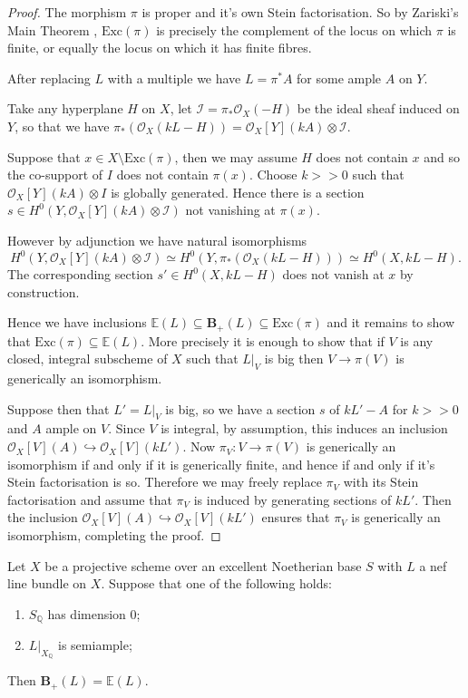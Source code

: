 \documentclass[a4paper,12pt]{book}
\newcommand{\BS}{\mathbf{B}_{+}}
\newcommand{\ox}{\mathcal{O}_{X}}
\begin{document}
\begin{proof}
	
	The morphism $\pi$ is proper and it's own Stein factorisation. So by Zariski's Main Theorem \cite[Tag 03GW]{stacks-project}, $\text{Exc}(\pi)$ is precisely the complement of the locus on which $\pi$ is finite, or equally the locus on which it has finite fibres.
	
	After replacing $L$ with a multiple we have $L=\pi^{*}A$ for some ample $A$ on $Y$.
	
	Take any hyperplane $H$ on $X$, let $\mathcal{I}=\pi_{*}\ox(-H)$ be the ideal sheaf induced on $Y$, so that we have $\pi_{*}(\ox(kL-H))=\ox[Y](kA)\otimes \mathcal{I}$. 
	
	Suppose that $x \in X \setminus \text{Exc}(\pi)$, then we may assume $H$ does not contain $x$ and so the co-support of $I$ does not contain $\pi(x)$. Choose $k>>0$ such that $\ox[Y](kA)\otimes I$ is globally generated. Hence there is a section $s \in H^{0}(Y,\ox[Y](kA)\otimes \mathcal{I})$ not vanishing at $\pi(x)$.
	
	However by adjunction we have natural isomorphisms $$H^{0}(Y,\ox[Y](kA)\otimes \mathcal{I}) \simeq H^{0}(Y,\pi_{*}(\ox(kL-H)))\simeq H^{0}(X,kL-H).$$ The corresponding section $s' \in H^{0}(X,kL-H)$ does not vanish at $x$ by construction.
	
	Hence we have inclusions $\mathbb{E}(L)\subseteq \BS(L)\subseteq \text{Exc}(\pi)$ and it remains to show that $\text{Exc}(\pi) \subseteq \mathbb{E}(L)$. More precisely it is enough to show that if $V$ is any closed, integral subscheme of $X$ such that $L|_{V}$ is big then $V \to \pi(V)$ is generically an isomorphism. 
	
	Suppose then that $L'=L|_{V}$ is big, so we have a section $s$ of $kL'-A$ for $k>>0$ and $A$ ample on $V$. Since $V$ is integral, by assumption, this induces an inclusion $\ox[V](A) \hookrightarrow \ox[V](kL')$. Now $\pi_{V}:V \to \pi(V)$ is generically an isomorphism if and only if it is generically finite, and hence if and only if it's Stein factorisation is so. Therefore we may freely replace $\pi_{V}$ with its Stein factorisation and assume that $\pi_{V}$ is induced by generating sections of $kL'$. Then the inclusion $\ox[V](A) \hookrightarrow \ox[V](kL')$ ensures that $\pi_{V}$ is generically an isomorphism, completing the proof.
\end{proof}


\begin{corollary}\label{Main_Loci}
	Let $X$ be a projective scheme over an excellent Noetherian base $S$ with $L$ a nef line bundle on $X$. 
	Suppose that one of the following holds:
	\begin{enumerate}
		\item $S_{\mathbb{Q}}$ has dimension $0$;
		\item $L|_{X_{\mathbb{Q}}}$ is semiample;
	\end{enumerate}
	Then $\BS(L)=\mathbb{E}(L)$.
\end{corollary}
\end{document}
